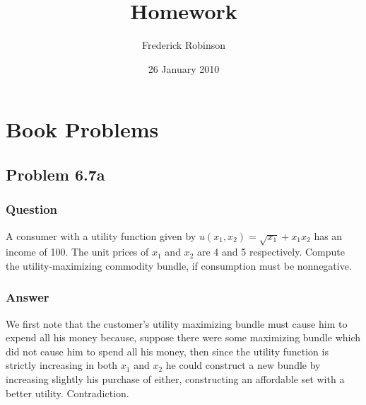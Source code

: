 \documentclass[12pt]{article}
\title{Homework}
\author{Frederick Robinson}
\date{26 January 2010}
\begin{document}

   \maketitle

\setcounter{tocdepth}{2} 

\tableofcontents

\section{Book Problems}

\subsection{Problem 6.7a}
\subsubsection{Question}
A consumer with a utility function given by $u(x_1,x_2) = \sqrt{x_1}+x_1 x_2$  has an income of 100. The unit prices of $x_1$ and $x_2$ are 4 and 5 respectively. Compute the utility-maximizing commodity bundle, if consumption must be nonnegative.
\subsubsection{Answer}
We first note that the customer's utility maximizing bundle must cause him to expend all his money because, suppose there were some maximizing bundle which did not cause him to spend all his money, then since the utility function is strictly increasing in both $x_1$ and $x_2$ he could construct a new bundle by increasing slightly his purchase of either, constructing an affordable set with a better utility. Contradiction.
\end{document}
